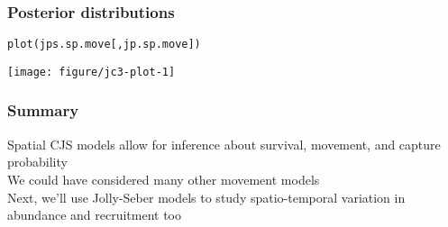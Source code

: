 \documentclass[color=usenames,dvipsnames]{beamer}\usepackage[]{graphicx}\usepackage[]{color}
\makeatletter
\newcommand{\hlstd}[1]{\textcolor[rgb]{0,0,0}{#1}}%
\newcommand{\hlkwd}[1]{\textcolor[rgb]{0.004,0.004,0.506}{#1}}%
\newenvironment{kframe}{%
 \def\at@end@of@kframe{}%
 \ifinner\ifhmode%
  \def\at@end@of@kframe{\end{minipage}}%
  \begin{minipage}{\columnwidth}%
 \fi\fi%
 \def\FrameCommand##1{\hskip\@totalleftmargin \hskip-\fboxsep
 \colorbox{shadecolor}{##1}\hskip-\fboxsep
     \hskip-\linewidth \hskip-\@totalleftmargin \hskip\columnwidth}%
 \MakeFramed {\advance\hsize-\width
   \@totalleftmargin\z@ \linewidth\hsize
   \@setminipage}}%
 {\par\unskip\endMakeFramed%
 \at@end@of@kframe}
\newenvironment{knitrout}{}{} %
\makeatother
\begin{document}
\begin{frame}[fragile]
  \frametitle{Posterior distributions}
\begin{knitrout}\scriptsize
{}\color{fgcolor}\begin{kframe}
\begin{alltt}
\hlkwd{plot}\hlstd{(jps.sp.move[,jp.sp.move])}
\end{alltt}
\end{kframe}

{\centering \texttt{[image: figure/jc3-plot-1]} 

}


\end{knitrout}
\end{frame}






\begin{frame}
  \frametitle{Summary}
  \large
  Spatial CJS models allow for inference about survival,
  movement, and capture probability \\
  \pause \vfill
  We could have considered many other movement models \\
  \pause \vfill
  Next, we'll use Jolly-Seber models to study spatio-temporal
  variation in abundance and recruitment too \\
\end{frame}



\end{document}
